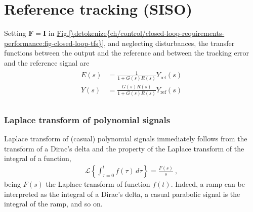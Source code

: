 \documentclass[letterpaper,10pt,english]{jupyterBook}
\begin{document}
\sphinxstepscope


\section{Reference tracking (SISO)}
\label{\detokenize{ch/control/closed-loop-requirements-performance-siso-ref-tracking:reference-tracking-siso}}\label{\detokenize{ch/control/closed-loop-requirements-performance-siso-ref-tracking:control-closed-loop-requirements-performance-siso-ref-tracking}}\label{\detokenize{ch/control/closed-loop-requirements-performance-siso-ref-tracking::doc}}
\sphinxAtStartPar
Setting \(\mathbf{F} = \mathbf{I}\) in \hyperref[\detokenize{ch/control/closed-loop-requirements-performance:fig-closed-loop-tfs}]{Fig.\@ \ref{\detokenize{ch/control/closed-loop-requirements-performance:fig-closed-loop-tfs}}}, and neglecting disturbances, the transfer functions between the output and the reference and between the tracking error and the reference signal are
\begin{equation*}
\begin{split}\begin{aligned}
  E(s) & = \frac{1}{1 + G(s) R(s)} Y_{\text{ref}}(s) \\
  Y(s) & = \frac{G(s)R(s)}{1 + G(s) R(s)} Y_{\text{ref}}(s) \\
\end{aligned}\end{split}
\end{equation*}
\sphinxAtStartPar
{}
\subsubsection*{Laplace transform of polynomial signals}

\sphinxAtStartPar
Laplace transform of (casual) polynomial signals immediately follows from the transform of a Dirac’s delta and the property of the Laplace transform of the integral of a function,
\begin{equation*}
\begin{split}\mathscr{L}\left\{ \int_{\tau=0}^{t} f(\tau) \, d \tau \right\} = \frac{F(s)}{s} \ , \end{split}
\end{equation*}
\sphinxAtStartPar
being \(F(s)\) the Laplace transform of function \(f(t)\). Indeed, a ramp can be interpreted as the integral of a Dirac’s delta, a casual parabolic signal is the integral of the ramp, and so on.
\end{document}
